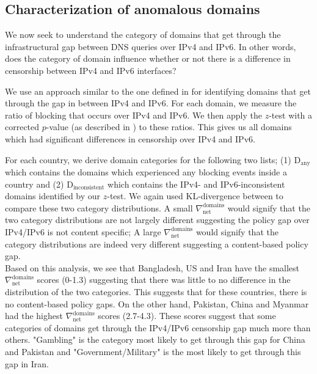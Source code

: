 \subsection{Characterization of anomalous domains}
\label{sec:infrastructure:domains}
We now seek to understand the category of domains that get through the
infrastructural gap between DNS queries over IPv4 and IPv6. In other words,
does the category of domain influence whether or not there is a difference in
censorship between IPv4 and IPv6 interfaces?

We use an approach similar to the one defined in 
for identifying domains that get through the gap in between IPv4 and IPv6. For
each domain, we measure the ratio of blocking that occurs over IPv4 and IPv6. We
then apply the $z$-test with a corrected $p$-value (as described in
) to these ratios. This gives us all domains which
had significant differences in censorship over IPv4 and IPv6.

For each country, we derive domain categories for the following two lists; (1)
$\text{D}_{\text{any}}$ which contains the domains which experienced any
blocking events inside a country and (2) $\text{D}_{\text{inconsistent}}$ which
contains the IPv4- and IPv6-inconsistent domains identified by our $z$-test. We
again used KL-divergence between to compare these two category distributions. A
small $\nabla_{\text{net}}^{\text{domains}}$ would signify that the two
category distributions are not largely different suggesting the policy gap over
IPv4/IPv6 is not content specific; A large
$\nabla_{\text{net}}^{\text{domains}}$ would signify that the category
distributions are indeed very different suggesting a content-based policy gap.
\\
Based on this analysis, we see that Bangladesh, US and Iran have the smallest
$\nabla_{\text{net}}^{\text{domains}}$ scores (0-1.3) suggesting that there
was little to no difference in the distribution of the two categories. This
suggests that for these countries, there is no content-based policy gaps. On the
other hand, Pakistan, China and Myanmar had the highest
$\nabla_{\text{net}}^{\text{domains}}$ scores (2.7-4.3). These scores suggest
that some categories of domains get through the IPv4/IPv6 censorship gap much
more than others. "Gambling" is the category most likely to get through this gap
for China and Pakistan and "Government/Military" is the most likely to get
through this gap in Iran. 

